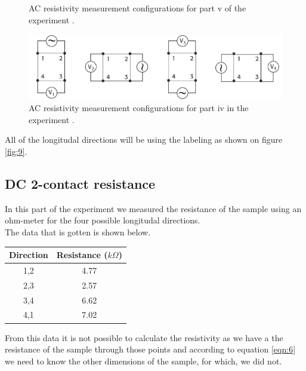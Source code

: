 \documentclass[twocolumn]{article}
\begin{document}
\begin{figure}
\begin{minipage}{0.46\textwidth}
\caption{AC resistivity measurement configurations for part v of the experiment 
\cite{ref:3}.}
\label{fig:11}
\end{minipage}
\vfill
\begin{minipage}{\textwidth}
\includegraphics[width=\linewidth]{AC-4-contact.png}
\caption{AC resistivity measurement configurations for part iv in the 
experiment \cite{ref:3}.}
\label{fig:12}
\end{minipage}
\end{figure}
All of the longitudal directions will be using the labeling as shown on figure 
\ref{fig:9}.
\subsection{DC 2-contact resistance}
In this part of the experiment we measured the resistance of the sample using 
an ohm-meter for the four possible longitudal directions.
\\
The data that is gotten is shown below.
\begin{minipage}{\linewidth}
\Centering
\begin{tabular}{|c|c|}
\hline
Direction & Resistance ($k\Omega$) \\ \hline
1,2 & 4.77 \\ \hline
2,3 & 2.57 \\ \hline
3,4 & 6.62 \\ \hline
4,1 & 7.02 \\ \hline
\end{tabular}
\label{tbl:3}
\end{minipage}
From this data it is not possible to calculate the resistivity as we have a 
the resistance of the sample through those points and according to equation 
\ref{eqn:6} we need to know the other dimensions of the sample, for which, we 
did not.
\end{document}
